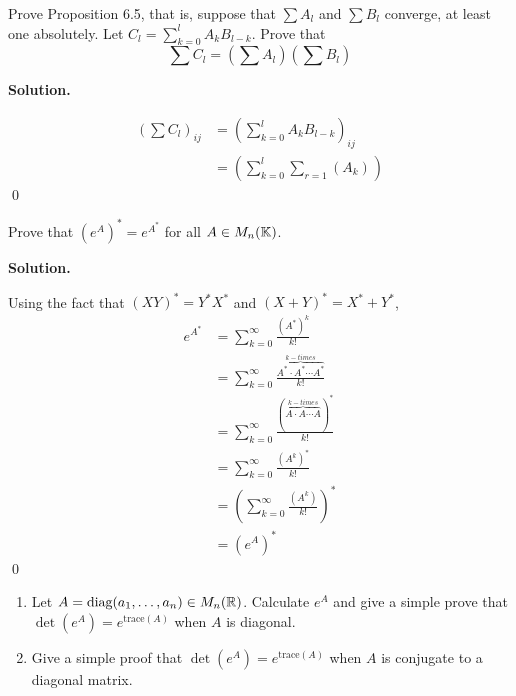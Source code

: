 \documentclass[12pt]{book}
\theoremstyle{definition}
\newenvironment{solution}
{%
  \par\noindent\textbf{Solution.}\quad
}
{%
  \qed\par
}
\begin{document}
\begin{taggedexercise}[WIP]
Prove Proposition 6.5, that is, suppose that $\sum A_l$ and $\sum B_l$ converge, at least one absolutely.
Let $C_l = \sum_{k=0}^l A_kB_{l-k}$. Prove that
\[
\sum C_l = (\sum A_l)(\sum B_l)
\]
\end{taggedexercise}

\begin{solution}
\[
\begin{aligned}
  (\sum C_l)_{ij} &= (\sum_{k=0}^l A_kB_{l-k})_{ij} \\
                  &= (\sum_{k=0}^l \sum_{r=1}(A_k)_{})
\end{aligned}
\]
\end{solution}

\begin{taggedexercise}[Complete]
  Prove that $(e^A)^* = e^{A^*}$ for all $A \in M_n(\mathbb{K})$.
\end{taggedexercise}

\begin{solution}
  Using the fact that $(XY)^* = Y^*X^*$ and $(X + Y)^* = X^* + Y^*$,
  \[
  \begin{aligned}
    e^{A^*} &= \sum_{k = 0}^\infty \frac{(A^*)^k}{k!} \\
            &= \sum_{k = 0}^\infty \frac{\overbrace{A^* \cdot A^* \cdots A^*}^{k-times}}{k!} \\
            &= \sum_{k = 0}^\infty \frac{(\overbrace{A \cdot A \cdots A}^{k-times})^*}{k!} \\
            &= \sum_{k = 0}^\infty \frac{(A^k)^*}{k!} \\
            &= \left(\sum_{k = 0}^\infty \frac{(A^k)}{k!}\right)^* \\
            &= (e^A)^*
  \end{aligned}
  \]
\end{solution}

\begin{taggedexercise}[Complete]
  \begin{enumerate}
    \item Let $A = \text{diag}(a_1, \dots, a_n) \in M_n(\mathbb{R})$. Calculate $e^A$ and give a simple prove that $\det(e^A) = e^{\text{trace}(A)}$ when $A$ is diagonal.
    \item Give a simple proof that $\det(e^A) = e^{\text{trace}(A)}$ when $A$ is conjugate to a diagonal matrix.
  \end{enumerate}
\end{taggedexercise}
\end{document}
